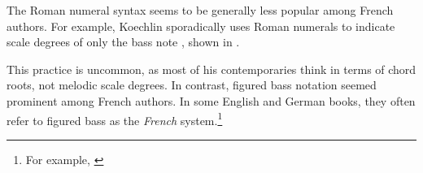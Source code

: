 

The Roman numeral syntax seems to be generally less popular
among French authors. For example, Koechlin sporadically
uses Roman numerals to indicate scale degrees of only the
bass note \textcite{koechlin1928traite}, shown in
.


This practice is uncommon, as most of his contemporaries
think in terms of chord roots, not melodic scale degrees. In
contrast, figured bass notation seemed prominent among
French authors. In some English and German books, they often
refer to figured bass as the \emph{French}
system.\footnote{For example,
\textcite{norris1894practical}}
